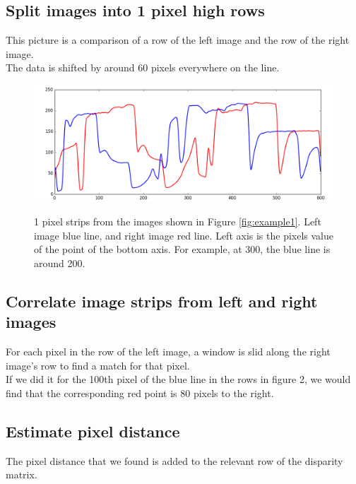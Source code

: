 \documentclass[11pt,fleqn]{article}
\begin{document}
\subsection{Split images into 1 pixel high rows}

This picture is a comparison of a row of the left image and the row of the right image. \\
The data is shifted by around 60 pixels everywhere on the line.

\begin{figure}[!ht]
\label{fig:strips}
\centering
\includegraphics[width=1\textwidth]{images/strips.png} \\[2pt]
\caption{1 pixel strips from the images shown in Figure \ref{fig:example1}. Left image blue line, and right image red line. Left axis is the pixels value of the point of the bottom axis. For example, at 300, the blue line is around 200.}
\end{figure}

\subsection{Correlate image strips from left and right images}
For each pixel in the row of the left image, a window is slid along the right image's row to find a match for that pixel.\\
If we did it for the 100th pixel of the blue line in the rows in figure 2, we would find that the corresponding red point is 80 pixels to the right.

\subsection{Estimate pixel distance}
The pixel distance that we found is added to the relevant row of the disparity matrix.
\end{document}
